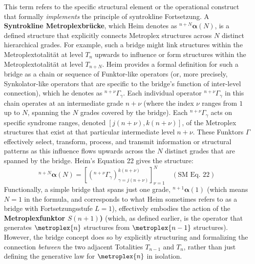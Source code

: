 \documentclass[
    12pt,              %
    a4paper,           %
    headings=normal,   %
    twoside=true,      %
    BCOR=8mm,          %
]{scrbook}
\newcommand{\metroplextotalitaet}[1]{T_{#1}}
\newcommand{\metroplexfunktorcommand}{S}
\newcommand{\syntroklinebruecke}[1]{{}^{#1}\bm{\alpha}}
\begin{document}
This term refers to the specific structural element or the operational construct that formally \textit{implements} the principle of syntrokline Fortsetzung. A \textbf{Syntrokline Metroplexbrücke}, which Heim denotes as \(\syntroklinebruecke{n+N}(N)\), is a defined structure that explicitly connects Metroplex structures across \(N\) distinct hierarchical grades. For example, such a bridge might link structures within the Metroplextotalität at level \(\metroplextotalitaet{n}\) upwards to influence or form structures within the Metroplextotalität at level \(\metroplextotalitaet{n+N}\).
Heim provides a formal definition for such a bridge as a chain or sequence of Funktor-like operators (or, more precisely, Synkolator-like operators that are specific to the bridge's function of inter-level connection), which he denotes as \( {}^{n+\nu}\Gamma_\gamma \). Each individual operator \( {}^{n+\nu}\Gamma_\gamma \) in this chain operates at an intermediate grade \( n+\nu \) (where the index \( \nu \) ranges from \( 1 \) up to \( N \), spanning the \(N\) grades covered by the bridge). Each \( {}^{n+\nu}\Gamma_\gamma \) acts on specific syndrome ranges, denoted \( [j(n+\nu), k(n+\nu)] \), of the Metroplex structures that exist at that particular intermediate level \( n+\nu \). These Funktors \( \Gamma \) effectively select, transform, process, and transmit information or structural patterns as this influence flows upwards across the \( N \) distinct grades that are spanned by the bridge. Heim's Equation 22 gives the structure:
\begin{equation} \label{eq:original_syntrokline_bridge} %
\syntroklinebruecke{n+N}(N) = \left[ ({}^{n+\nu}\Gamma_\gamma)^{k(n+\nu)}_{\gamma=j(n+\nu)} \right]_{\nu=1}^N \quad (\text{SM Eq. 22})
\end{equation}
Functionally, a simple bridge that spans just one grade, \( \syntroklinebruecke{n+1}(1) \) (which means \( N=1 \) in the formula, and corresponds to what Heim sometimes refers to as a bridge with Fortsetzungsstufe \( L=1 \)), effectively embodies the action of the \textbf{Metroplexfunktor \(\metroplexfunktorcommand(n+1)\))} (which, as defined earlier, is the operator that generates \(\metroplex{n}\) structures from \(\metroplex{n-1}\) structures). However, the bridge concept does so by explicitly structuring and formalizing the connection \textit{between} the two adjacent Totalities \(\metroplextotalitaet{n-1}\) and \(\metroplextotalitaet{n}\), rather than just defining the generative law for \(\metroplex{n}\) in isolation.
\end{document}
